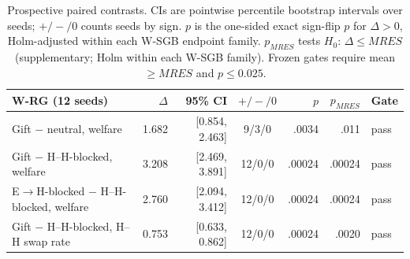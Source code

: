 \documentclass[sigconf,anonymous]{aamas}
\newcommand{\mres}{MRES\xspace}
\begin{document}
\begin{table}[t]
\caption{Prospective paired contrasts.  CIs are pointwise percentile bootstrap
intervals over seeds; $+/-/0$ counts seeds by sign.  $p$ is the one-sided exact
sign-flip $p$ for $\Delta>0$, Holm-adjusted within each W-SGB endpoint family.
$p_{\mres}$ tests $H_0{:}\,\Delta\le\mres$ (supplementary; Holm within each W-SGB
family).  Frozen gates require mean $\ge\mres$ and $p\le0.025$.}
\label{tab:contrasts}
\footnotesize
\centering
\setlength{\tabcolsep}{4pt}
\begin{tabular}{@{}lrrcrrl@{}}
\toprule
W-RG (12 seeds) & $\Delta$ & 95\% CI & $+/-/0$ & $p$ & $p_{\mres}$ & Gate \\
\midrule
Gift $-$ neutral, welfare & 1.682 & [0.854, 2.463] & 9/3/0 & .0034 & .011 & pass \\
Gift $-$ H--H-blocked, welfare & 3.208 & [2.469, 3.891] & 12/0/0 & .00024 & .00024 & pass \\
E$\rightarrow$H-blocked $-$ H--H-blocked, welfare & 2.760 & [2.094, 3.412] & 12/0/0 & .00024 & .00024 & pass \\
Gift $-$ H--H-blocked, H--H swap rate & 0.753 & [0.633, 0.862] & 12/0/0 & .00024 & .0020 & pass \\
\bottomrule
\end{tabular}


\end{table}
\end{document}
